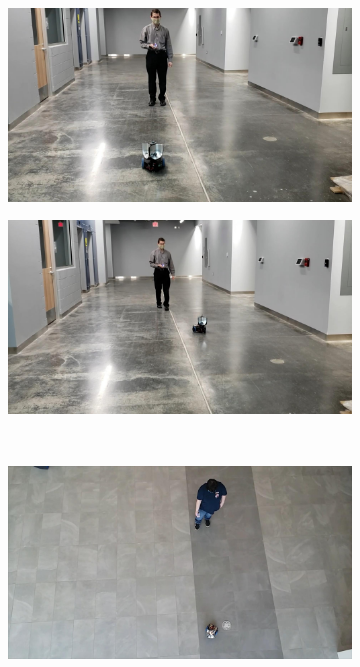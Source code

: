 \documentclass[conference]{IEEEtran}
\begin{document}
\begin{figure}[htbp]
\begin{subfigure}[b]{0.24\linewidth}
   \centering
   \includegraphics[width=\textwidth]{videos/frames/211.jpeg} 
   \caption{}
   \label{fig:211}
  \end{subfigure}
  \begin{subfigure}[b]{0.24\linewidth}
    \centering
    \includegraphics[width=\textwidth]{videos/frames/351.jpeg} 
    \caption{}
    \label{fig:351}
  \end{subfigure}
  \\
  \begin{subfigure}[b]{0.24\linewidth}
    \centering
    \includegraphics[width=\textwidth]{videos/frames/491.jpeg} 

\end{subfigure}
\end{figure}
\end{document}
